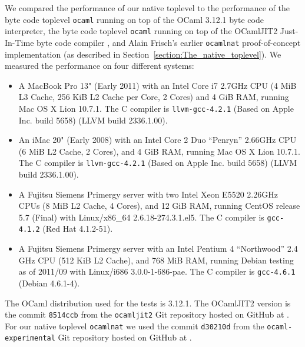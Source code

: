 \documentclass[10pt,a4paper,final,twocolumn]{article}
\begin{document}
We compared the performance of our native toplevel to the performance of the byte code toplevel
\texttt{ocaml} running on top of the OCaml 3.12.1 byte code interpreter, the byte code toplevel
\texttt{ocaml} running on top of the OCamlJIT2 Just-In-Time byte code compiler
\cite{Meurer10jit,Meurer10ocamljit,Meurer11ocamljit2}, and Alain Frisch's earlier \texttt{ocamlnat}
proof-of-concept implementation (as described in Section~\ref{section:The_native_toplevel}).
 We measured the performance on four different systems:
\begin{itemize}
\item A MacBook Pro 13" (Early 2011) with an Intel Core i7 2.7GHz CPU (4 MiB L3 Cache, 256 KiB L2 Cache per Core,
  2 Cores) and 4 GiB RAM, running Mac OS X Lion 10.7.1. The C compiler is
  \texttt{llvm-gcc-4.2.1} (Based on Apple Inc. build 5658) (LLVM build 2336.1.00).
\item An iMac 20" (Early 2008) with an Intel Core 2 Duo ``Penryn'' 2.66GHz CPU (6 MiB L2 Cache, 2 Cores),
  and 4 GiB RAM, running Mac OS X Lion 10.7.1. The C compiler is
  \texttt{llvm-gcc-4.2.1} (Based on Apple Inc. build 5658) (LLVM build 2336.1.00).
\item A Fujitsu Siemens Primergy server with two Intel Xeon E5520 2.26GHz CPUs (8 MiB L2 Cache, 4 Cores),
  and 12 GiB RAM, running CentOS release 5.7 (Final) with Linux/x86\_64 2.6.18-274.3.1.el5.
  The C compiler is \texttt{gcc-4.1.2} (Red Hat 4.1.2-51).
\item A Fujitsu Siemens Primergy server with an Intel Pentium 4 ``Northwood'' 2.4 GHz CPU (512 KiB L2 Cache),
  and 768 MiB RAM, running Debian testing as of 2011/09 with Linux/i686 3.0.0-1-686-pae.
  The C compiler is \texttt{gcc-4.6.1} (Debian 4.6.1-4).
\end{itemize}

The OCaml distribution used for the tests is 3.12.1. The OCamlJIT2 version is the commit \texttt{8514ccb}
from the \texttt{ocamljit2} Git repository hosted on GitHub at \cite{Meurer11ocamljit2}. For
our native toplevel \texttt{ocamlnat} we used the commit \texttt{d30210d} from the \texttt{ocaml-experimental}
Git repository hosted on GitHub at \cite{Meurer11ocamlexperimental}.
\end{document}
